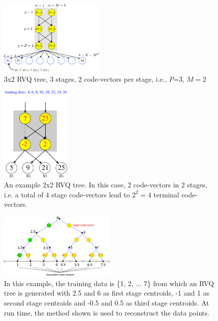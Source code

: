 \documentclass{article}
\begin{document}
\begin{figure}[t]
\centering	
\includegraphics[width=0.45\textwidth]{figs/RVQ_trellis.pdf}
\caption{3x2 RVQ tree, 3 stages, 2 code-vectors per stage, i.e., $P$=3, $M=2$} 
\label{fig:RVQ_sigma_tree}				
\end{figure}



\begin{figure}[t]
\centering
\includegraphics[width=0.3\textwidth]{figs/RVQ_introduction.pdf}
\caption{An example 2x2 RVQ tree.  In this case, 2 code-vectors in 2 stages, i.e. a total of 4 stage code-vectors lead to $2^2=4$ terminal code-vectors.}
\label{fig:RVQ_sigma_tree_example}
\end{figure}



\begin{figure}[t]
\centering
\includegraphics[width=0.5\textwidth]{figs/RVQ_trg_1_to_7_equivalentCVs.pdf}
\caption{In this example, the training data is \{1, 2, ... 7\} from which an RVQ tree is generated with 2.5 and 6 as first stage centroids, -1 and 1 as second stage centroids and -0.5 and 0.5 as third stage centroids.  At run time, the method shown is used to reconstruct the data points.}
\label{fig:RVQ_reconstruction}
\end{figure}
\end{document}
